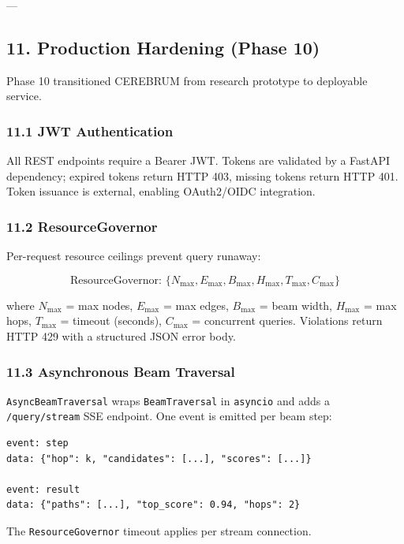 \documentclass[10pt,journal,compsoc]{IEEEtran}
\begin{document}
---

\subsection{11. Production Hardening (Phase 10)}

Phase 10 trans\-itioned CEREBRUM from research prototype to deployable service.

\subsubsection{11.1 JWT Authen\-tication}

All REST endpoints require a Bearer JWT. Tokens are validated by a FastAPI
dependency; expired tokens return HTTP 403, missing tokens return HTTP 401.
Token issuance is external, enabling OAuth2/OIDC integration.

\subsubsection{11.2 ResourceGovernor}

Per-request resource ceilings prevent query runaway:

\begin{equation}
\text{ResourceGovernor: } \{N_{\max}, E_{\max}, B_{\max}, H_{\max}, T_{\max}, C_{\max}\}
\end{equation}

where $N_{\max}$ = max nodes, $E_{\max}$ = max edges, $B_{\max}$ = beam width,
$H_{\max}$ = max hops, $T_{\max}$ = timeout (seconds), $C_{\max}$ = concurrent
queries. Violations return HTTP 429 with a structured JSON error body.

\subsubsection{11.3 Asynch\-ronous Beam Traversal}

\texttt{AsyncBeamTraversal} wraps \texttt{BeamTraversal} in \texttt{asyncio} and adds a
\texttt{/query/stream} SSE endpoint. One event is emitted per beam step:

\begin{lstlisting}
event: step
data: {"hop": k, "candidates": [...], "scores": [...]}

event: result
data: {"paths": [...], "top_score": 0.94, "hops": 2}
\end{lstlisting}

The \texttt{ResourceGovernor} timeout applies per stream connection.
\end{document}

